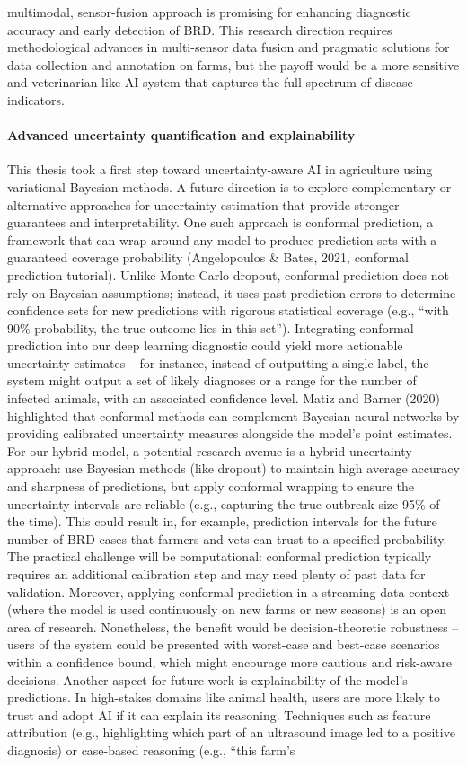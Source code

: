 multimodal, sensor-fusion approach is promising for enhancing diagnostic accuracy and early detection of BRD. This research direction requires methodological advances in multi-sensor data fusion and pragmatic solutions for data collection and annotation on farms, but the payoff would be a more sensitive and veterinarian-like AI system that captures the full spectrum of disease indicators.

\paragraph{Advanced uncertainty quantification and explainability} This thesis took a first step toward uncertainty-aware AI in agriculture using variational Bayesian methods. A future direction is to explore complementary or alternative approaches for uncertainty estimation that provide stronger guarantees and interpretability. One such approach is conformal prediction, a framework that can wrap around any model to produce prediction sets with a guaranteed coverage probability (Angelopoulos \& Bates, 2021, conformal prediction tutorial). Unlike Monte Carlo dropout, conformal prediction does not rely on Bayesian assumptions; instead, it uses past prediction errors to determine confidence sets for new predictions with rigorous statistical coverage (e.g., “with 90\% probability, the true outcome lies in this set”). Integrating conformal prediction into our deep learning diagnostic could yield more actionable uncertainty estimates – for instance, instead of outputting a single label, the system might output a set of likely diagnoses or a range for the number of infected animals, with an associated confidence level. Matiz and Barner (2020) highlighted that conformal methods can complement Bayesian neural networks by providing calibrated uncertainty measures alongside the model’s point estimates. For our hybrid model, a potential research avenue is a hybrid uncertainty approach: use Bayesian methods (like dropout) to maintain high average accuracy and sharpness of predictions, but apply conformal wrapping to ensure the uncertainty intervals are reliable (e.g., capturing the true outbreak size 95\% of the time). This could result in, for example, prediction intervals for the future number of BRD cases that farmers and vets can trust to a specified probability. The practical challenge will be computational: conformal prediction typically requires an additional calibration step and may need plenty of past data for validation. Moreover, applying conformal prediction in a streaming data context (where the model is used continuously on new farms or new seasons) is an open area of research. Nonetheless, the benefit would be decision-theoretic robustness – users of the system could be presented with worst-case and best-case scenarios within a confidence bound, which might encourage more cautious and risk-aware decisions. Another aspect for future work is explainability of the model’s predictions. In high-stakes domains like animal health, users are more likely to trust and adopt AI if it can explain its reasoning. Techniques such as feature attribution (e.g., highlighting which part of an ultrasound image led to a positive diagnosis) or case-based reasoning (e.g., “this farm’s 